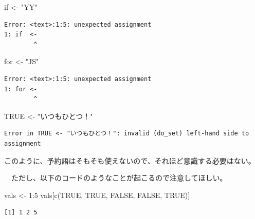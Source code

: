 \documentclass[
  a4paper,
  pandoc,
  ja=standard,
  jafont=haranoaji]{bxjsbook}
\newenvironment{Shaded}{\begin{snugshade}}{\end{snugshade}}
\newcommand{\ConstantTok}[1]{\textcolor[rgb]{0.56,0.35,0.01}{#1}}
\newcommand{\ControlFlowTok}[1]{\textcolor[rgb]{0.00,0.48,0.65}{#1}}
\newcommand{\DecValTok}[1]{\textcolor[rgb]{0.68,0.00,0.00}{#1}}
\newcommand{\FunctionTok}[1]{\textcolor[rgb]{0.28,0.35,0.67}{#1}}
\newcommand{\NormalTok}[1]{\textcolor[rgb]{0.00,0.48,0.65}{#1}}
\newcommand{\OtherTok}[1]{\textcolor[rgb]{0.00,0.48,0.65}{#1}}
\newcommand{\SpecialCharTok}[1]{\textcolor[rgb]{0.37,0.37,0.37}{#1}}
\newcommand{\StringTok}[1]{\textcolor[rgb]{0.13,0.47,0.30}{#1}}
\begin{document}
\begin{Shaded}
\begin{Highlighting}[numbers=left,,]
\ControlFlowTok{if}  \OtherTok{\textless{}{-}} \StringTok{"YY"}
\end{Highlighting}
\end{Shaded}

\begin{verbatim}
Error: <text>:1:5: unexpected assignment
1: if  <-
        ^
\end{verbatim}

\begin{Shaded}
\begin{Highlighting}[numbers=left,,]
\ControlFlowTok{for} \OtherTok{\textless{}{-}} \StringTok{"JS"}
\end{Highlighting}
\end{Shaded}

\begin{verbatim}
Error: <text>:1:5: unexpected assignment
1: for <-
        ^
\end{verbatim}

\begin{Shaded}
\begin{Highlighting}[numbers=left,,]
\ConstantTok{TRUE} \OtherTok{\textless{}{-}} \StringTok{"いつもひとつ！"}
\end{Highlighting}
\end{Shaded}

\begin{verbatim}
Error in TRUE <- "いつもひとつ！": invalid (do_set) left-hand side to assignment
\end{verbatim}

このように、予約語はそもそも使えないので、それほど意識する必要はない。

　ただし、以下のコードのようなことが起こるので注意してほしい。

\begin{Shaded}
\begin{Highlighting}[numbers=left,,]
\NormalTok{vals }\OtherTok{\textless{}{-}} \DecValTok{1}\SpecialCharTok{:}\DecValTok{5}
\NormalTok{vals[}\FunctionTok{c}\NormalTok{(}\ConstantTok{TRUE}\NormalTok{, }\ConstantTok{TRUE}\NormalTok{, }\ConstantTok{FALSE}\NormalTok{, }\ConstantTok{FALSE}\NormalTok{, }\ConstantTok{TRUE}\NormalTok{)]}
\end{Highlighting}
\end{Shaded}

\begin{verbatim}
[1] 1 2 5
\end{verbatim}
\end{document}
